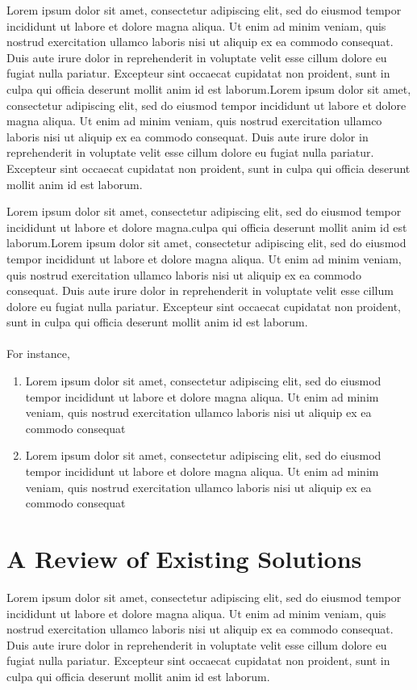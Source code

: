 \documentclass[a4paper,12 pt,oneside]{book}
\begin{document}
Lorem ipsum dolor sit amet, consectetur adipiscing elit, sed do eiusmod tempor incididunt ut labore et dolore magna aliqua. Ut enim ad minim veniam, quis nostrud exercitation ullamco laboris nisi ut aliquip ex ea commodo consequat. Duis aute irure dolor in reprehenderit in voluptate velit esse cillum dolore eu fugiat nulla pariatur. Excepteur sint occaecat cupidatat non proident, sunt in culpa qui officia deserunt mollit anim id est laborum.Lorem ipsum dolor sit amet, consectetur adipiscing elit, sed do eiusmod tempor incididunt ut labore et dolore magna aliqua. Ut enim ad minim veniam, quis nostrud exercitation ullamco laboris nisi ut aliquip ex ea commodo consequat. Duis aute irure dolor in reprehenderit in voluptate velit esse cillum dolore eu fugiat nulla pariatur. Excepteur sint occaecat cupidatat non proident, sunt in culpa qui officia deserunt mollit anim id est laborum.

Lorem ipsum dolor sit amet, consectetur adipiscing elit, sed do eiusmod tempor incididunt ut labore et dolore magna\cite{abrol2001navigating}.culpa qui officia deserunt mollit anim id est laborum.Lorem ipsum dolor sit amet, consectetur adipiscing elit, sed do eiusmod tempor incididunt ut labore et dolore magna aliqua. Ut enim ad minim veniam, quis nostrud exercitation ullamco laboris nisi ut aliquip ex ea commodo consequat. Duis aute irure dolor in reprehenderit in voluptate velit esse cillum dolore eu fugiat nulla pariatur. Excepteur sint occaecat cupidatat non proident, sunt in culpa qui officia deserunt mollit anim id est laborum.\\
\\

For instance, 

\begin{enumerate}
    \item Lorem ipsum dolor sit amet, consectetur adipiscing elit, sed do eiusmod tempor incididunt ut labore et dolore magna aliqua. Ut enim ad minim veniam, quis nostrud exercitation ullamco laboris nisi ut aliquip ex ea commodo consequat
    \item Lorem ipsum dolor sit amet, consectetur adipiscing elit, sed do eiusmod tempor incididunt ut labore et dolore magna aliqua. Ut enim ad minim veniam, quis nostrud exercitation ullamco laboris nisi ut aliquip ex ea commodo consequat
\end{enumerate}

\pagebreak

\chapter{A Review of Existing Solutions}
Lorem ipsum dolor sit amet, consectetur adipiscing elit, sed do eiusmod tempor incididunt ut labore et dolore magna aliqua. Ut enim ad minim veniam, quis nostrud exercitation ullamco laboris nisi ut aliquip ex ea commodo consequat. Duis aute irure dolor in reprehenderit in voluptate velit esse cillum dolore eu fugiat nulla pariatur. Excepteur sint occaecat cupidatat non proident, sunt in culpa qui officia deserunt mollit anim id est laborum.
\end{document}

